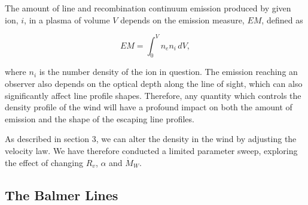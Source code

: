 \documentclass[preprint, a4paper, 11pt]{aastex}
\begin{document}
The amount of line and recombination continuum
emission produced by given ion, $i$, in a plasma of volume $V$
depends on the emission measure, $EM$, defined as

\begin{equation}
EM=\int^V_0 n_e n_i \,dV,
\end{equation}

where $n_i$ is the number density of the ion in question. 
The emission reaching an observer 
also depends on the optical depth along 
the line of sight, which can also significantly affect line profile shapes.
Therefore, any quantity which controls the density profile of the wind
will have a profound impact on both the 
amount of emission and the shape of the escaping line profiles.

As described in section 3, we can alter the density in the wind by 
adjusting the velocity law. We have therefore conducted a limited parameter 
sweep, exploring the effect of changing $R_v$, $\alpha$ and $\dot{M}_W$.


\subsection{The Balmer Lines}
\end{document}
